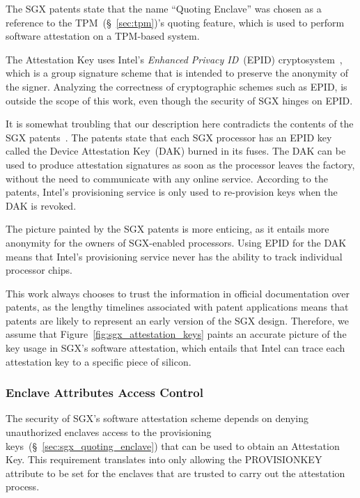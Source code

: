 
The SGX patents state that the name ``Quoting Enclave'' was chosen as a
reference to the TPM~(\S~\ref{sec:tpm})'s quoting feature, which is used to
perform software attestation on a TPM-based system.

The Attestation Key uses Intel's \textit{Enhanced Privacy ID}~(EPID)
cryptosystem~\cite{brickell2009epid}, which is a group signature scheme that is
intended to preserve the anonymity of the signer. Analyzing the correctness of
cryptographic schemes such as EPID, is outside the scope of this work, even
though the security of SGX hinges on EPID.

It is somewhat troubling that our description here contradicts the contents of
the SGX patents~\cite{intel2013patent1, intel2013patent2}. The patents state
that each SGX processor has an EPID key called the Device Attestation Key~(DAK)
burned in its fuses. The DAK can be used to produce attestation signatures as
soon as the processor leaves the factory, without the need to communicate with
any online service. According to the patents, Intel's provisioning service is
only used to re-provision keys when the DAK is revoked.

The picture painted by the SGX patents is more enticing, as it entails more
anonymity for the owners of SGX-enabled processors. Using EPID for the DAK
means that Intel's provisioning service never has the ability to track
individual processor chips.

This work always chooses to trust the information in official documentation
over patents, as the lengthy timelines associated with patent applications
means that patents are likely to represent an early version of the SGX design.
Therefore, we assume that Figure~\ref{fig:sgx_attestation_keys} paints an
accurate picture of the key usage in SGX's software attestation, which entails
that Intel can trace each attestation key to a specific piece of silicon.


\subsubsection{Enclave Attributes Access Control}
\label{sec:sgx_launch_enclave}


The security of SGX's software attestation scheme depends on denying
unauthorized enclaves access to the provisioning
keys~(\S~\ref{sec:sgx_quoting_enclave}) that can be used to obtain an
Attestation Key. This requirement translates into only allowing the
PROVISIONKEY attribute to be set for the enclaves that are trusted to carry out
the attestation process.

